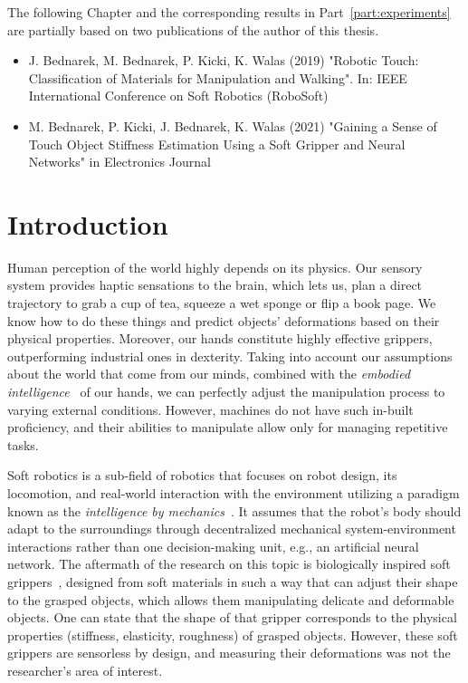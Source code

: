 \documentclass[a4paper, 10pt, twoside]{report}
\begin{document}
\begin{notefromauthor}
    The following Chapter and the corresponding results in Part~\ref{part:experiments} are partially based on two publications of the author of this thesis. 
    
    \begin{itemize}
        \item {} J. Bednarek, M. Bednarek, P. Kicki, K. Walas (2019) "Robotic Touch: Classification of Materials for Manipulation and Walking". In: IEEE International Conference on Soft Robotics (RoboSoft)
        
        \item M. Bednarek, P. Kicki, J. Bednarek, K. Walas (2021) "Gaining a Sense of Touch Object Stiffness Estimation Using a Soft Gripper and Neural Networks" in Electronics Journal
        
    \end{itemize}
\end{notefromauthor}

\section{Introduction}
\label{part:methods:materials:introduction}

Human perception of the world highly depends on its physics. Our sensory system provides haptic sensations to the brain, which lets us, \eg plan a direct trajectory to grab a cup of tea, squeeze a wet sponge or flip a book page. We know how to do these things and predict objects' deformations based on their physical properties. Moreover, our hands constitute highly effective grippers, outperforming industrial ones in dexterity. Taking into account our assumptions about the world that come from our minds, combined with the \textit{embodied intelligence}~\cite{IIda07} of our hands, we can perfectly adjust the manipulation process to varying external conditions. However, machines do not have such in-built proficiency, and their abilities to manipulate allow only for managing repetitive tasks. 

Soft robotics is a sub-field of robotics that focuses on robot design, its locomotion, and real-world interaction with the environment utilizing 
a paradigm known as the \textit{intelligence by mechanics}~\cite{IIda07}. It assumes that the robot's body should adapt to the surroundings through decentralized mechanical system-environment interactions rather than one decision-making unit, e.g., an artificial neural network. The aftermath of the research on this topic is biologically inspired soft grippers~\cite{YaleOpenHand, MIT3fingerGripper, MITorigamiGripper, LaschiGripper}, designed from soft materials in such a way that can adjust their shape to the grasped objects, which allows them manipulating delicate and deformable objects. One can state that the shape of that gripper corresponds to the physical properties (\eg stiffness, elasticity, roughness) of grasped objects. However, these soft grippers are sensorless by design, and measuring their deformations was not the researcher's area of interest. 
\end{document}
